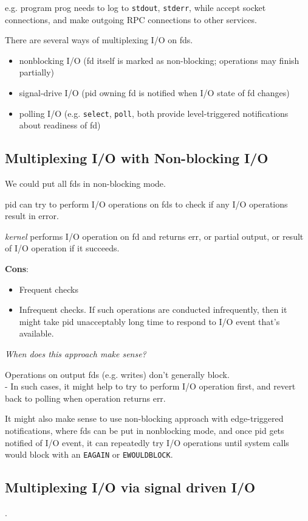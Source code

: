\documentclass[10pt]{amsart}
\begin{document}
\begin{multicols*}{2}
e.g. program prog needs to log to \texttt{stdout}, \texttt{stderr}, while accept socket connections, and make outgoing RPC connections to other services. 


There are several ways of multiplexing I/O on fds.
\begin{itemize}
	\item nonblocking I/O (fd itself is marked as non-blocking; operations may finish partially)
	\item signal-drive I/O (pid owning fd is notified when I/O state of fd changes)
	\item polling I/O (e.g. \texttt{select}, \texttt{poll}, both provide level-triggered notifications about readiness of fd)
\end{itemize}

\subsection{Multiplexing I/O with Non-blocking I/O}

We could put all fds in non-blocking mode.

pid can try to perform I/O operations on fds to check if any I/O operations result in error.

\emph{kernel} performs I/O operation on fd and returns err, or partial output, or result of I/O operation if it succeeds.

\textbf{Cons}:
\begin{itemize}
	\item Frequent checks
	\item Infrequent checks. If such operations are conducted infrequently, then it might take pid unacceptably long time to respond to I/O event that's available.
\end{itemize}

\emph{When does this approach make sense?}

Operations on output fds (e.g. writes) don't generally block.  \\
- In such cases, it might help to try to perform I/O operation first, and revert back to polling when operation returns err.

It might also make sense to use non-blocking approach with edge-triggered notifications, where fds can be put in nonblocking mode, and once pid gets notified of I/O event, it can repeatedly try I/O operations until system calls would block with an \texttt{EAGAIN} or \texttt{EWOULDBLOCK}. 

\subsection{Multiplexing I/O via signal driven I/O}.


\end{multicols*}
\end{document}
